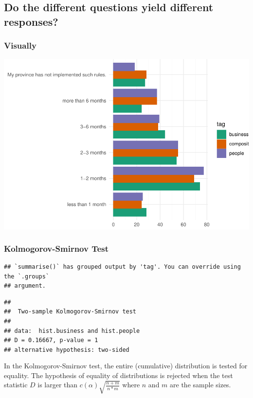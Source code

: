 \documentclass[
]{article}
\begin{document}
\hypertarget{do-the-different-questions-yield-different-responses}{%
\subsection{Do the different questions yield different
responses?}\label{do-the-different-questions-yield-different-responses}}

\hypertarget{visually}{%
\subsubsection{Visually}\label{visually}}

\includegraphics{evaluation_files/figure-latex/graph-1.pdf}

\hypertarget{kolmogorov-smirnov-test}{%
\subsubsection{Kolmogorov-Smirnov Test}\label{kolmogorov-smirnov-test}}

\begin{verbatim}
## `summarise()` has grouped output by 'tag'. You can override using the `.groups`
## argument.
\end{verbatim}

\begin{verbatim}
## 
##  Two-sample Kolmogorov-Smirnov test
## 
## data:  hist.business and hist.people
## D = 0.16667, p-value = 1
## alternative hypothesis: two-sided
\end{verbatim}

In the Kolmogorov-Smirnov test, the entire (cumulative) distribution is
tested for equality. The hypothesis of equality of distributions is
rejected when the test statistic \(D\) is larger than
\(c(\alpha) \sqrt{\frac{n+m}{n*m}}\) where \(n\) and \(m\) are the
sample sizes.
\end{document}
